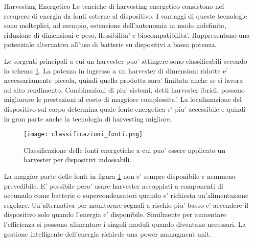 \begin{section}{Harvesting Energetico}
    Le tenciche di harvesting energetico consistono nel recupero di energia da fonti esterne al dispositivo. I vantaggi di queste tecnologie sono molteplici, ad esempio, estensione dell'autonomia in modo indefinito, riduzione di dimensioni e peso, flessibilita' e biocompatibilita'. Rappresentano una potenziale alternativa all'uso di batterie su dispositivi a bassa potenza.

    Le sorgenti principali a cui un harvester puo' attingere sono classificabili secondo lo schema \ref{fig:classificazione}. La potenza in ingresso a un harvester di dimensioni ridotte e' necessariamente piccola, quindi quella prodotta sara' limitata anche se si lavora ad alto rendimento. Combinazioni di piu' sistemi, detti harvester ibridi, possono migliorare le prestazioni al costo di maggiore complessita'. La localizzazione del dispositivo sul corpo determina quale fonte energetica e' piu' accessibile e quindi in gran parte anche la tecnologia di harvesting migliore.
    \begin{figure}[H]
        \texttt{[image: classificazioni\_fonti.png]}
        \centering
        \caption{Classificazione delle fonti energetiche a cui puo' essere applicato un harvester per dispositivi indossabili.}
        \label{fig:classificazione}
    \end{figure}
    
    La maggior parte delle fonti in figura \ref{fig:classificazione} non e' sempre disponibile e nemmeno prevedibile. E' possibile pero' usare harvester accoppiati a componenti di accumulo come batterie o supercondensatori quando e' richiesta un'alimentazione regolare. Un'alternativa per monitorare segnali a rischio piu' basso e' accendere il dispositivo solo quando l'energia e' disponibile. Similmente per aumentare l'efficienza si possono alimentare i singoli moduli quando diventano necessari. La gestione intelligente dell'energia richiede una power managment unit.
\end{section}

